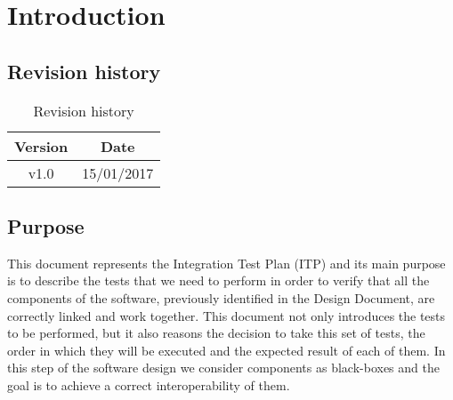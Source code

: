 \chapter{Introduction}

\section{Revision history}
\begin{table}[!h]
\centering
\caption{Revision history}
\label{my-label}
\begin{tabular}{|c|c|}
\hline
Version & Date       \\ \hline
v1.0    & 15/01/2017 \\ \hline
\end{tabular}
\end{table}

\section{Purpose}
This document represents the Integration Test Plan (ITP) and its main purpose is to describe the tests that we need to perform in order to verify that all the components of the software, previously identified in the Design Document, are correctly linked and work together.
This document not only introduces the tests to be performed, but it also reasons the decision to take this set of tests, the order in which they will be executed and the expected result of each of them. In this step of the software design we consider components as black-boxes and the goal is to achieve a correct interoperability of them.

